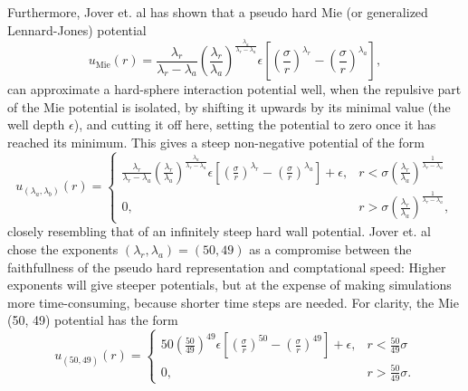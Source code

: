 Furthermore, Jover et. al \cite{Jover:pseudo_hard} has shown that a pseudo hard Mie (or generalized Lennard-Jones) potential
\begin{equation}
    u_{\text{Mie}}(r) = 
        \frac{\lambda_r}{\lambda_r - \lambda_a}
        \left(\frac{\lambda_r}{\lambda_a}\right)
        ^{\frac{\lambda_a}{\lambda_r - \lambda_a}}
        \epsilon \left[
            \left(\frac{\sigma}{r}\right)^{\lambda_r} -
            \left(\frac{\sigma}{r}\right)^{\lambda_a}
        \right],
\end{equation}
can approximate a hard-sphere interaction potential well, when the repulsive part of the Mie potential is isolated, by shifting it upwards by its minimal value (the well depth $\epsilon$), and cutting it off here, setting the potential to zero once it has reached its minimum.
This gives a steep non-negative potential of the form
\begin{equation}
    u_{(\lambda_a, \lambda_b)}(r) = 
    \begin{cases}
        \frac{\lambda_r}{\lambda_r - \lambda_a}
        \left(\frac{\lambda_r}{\lambda_a}\right)
        ^{\frac{\lambda_a}{\lambda_r - \lambda_a}}
        \epsilon \left[
            \left(\frac{\sigma}{r}\right)^{\lambda_r} -
            \left(\frac{\sigma}{r}\right)^{\lambda_a}
        \right]
        + \epsilon,
            & r < \sigma \left(
                \frac{\lambda_r}{\lambda_a}
            \right)^\frac{1}{\lambda_r - \lambda_a} \\
        0,  & r > \sigma \left(
                \frac{\lambda_r}{\lambda_a}
            \right)^\frac{1}{\lambda_r - \lambda_a},
    \end{cases}
\end{equation}
closely resembling that of an infinitely steep hard wall potential.
Jover et. al chose the exponents $(\lambda_r, \lambda_a) = (50, 49)$ as a compromise between the faithfullness of the pseudo hard representation and comptational speed:
Higher exponents will give steeper potentials, but at the expense of making simulations more time-consuming, because shorter time steps are needed.
For clarity, the Mie (50, 49) potential has the form
\begin{equation}
    u_{(50, 49)}(r) = 
    \begin{cases}
        50
        \left(\frac{50}{49}\right)
        ^{49}
        \epsilon \left[
            \left(\frac{\sigma}{r}\right)^{50} -
            \left(\frac{\sigma}{r}\right)^{49}
        \right]
        + \epsilon,
            & r < \frac{50}{49} \sigma\\
        0,  & r > \frac{50}{49} \sigma.
    \end{cases}
\end{equation}
